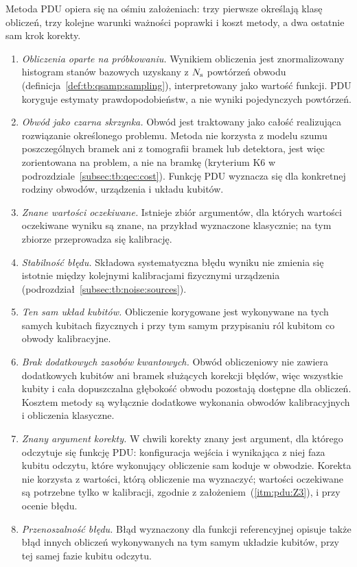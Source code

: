 Metoda PDU opiera się na ośmiu założeniach: trzy pierwsze określają klasę obliczeń, trzy kolejne warunki ważności poprawki i koszt metody, a dwa ostatnie sam krok korekty.
\begin{enumerate}
\renewcommand{\theenumi}{Z\arabic{enumi}}
\renewcommand{\labelenumi}{(\theenumi)}
\item\label{itm:pdu:Z1} \emph{Obliczenia oparte na próbkowaniu.}
Wynikiem obliczenia jest znormalizowany histogram stanów bazowych uzyskany z $N_{\mathrm{s}}$ powtórzeń obwodu (definicja~\ref{def:tb:qsamp:sampling}), interpretowany jako wartość funkcji.
PDU koryguje estymaty prawdopodobieństw, a nie wyniki pojedynczych powtórzeń.
\item\label{itm:pdu:Z2} \emph{Obwód jako czarna skrzynka.}
Obwód jest traktowany jako całość realizująca rozwiązanie określonego problemu.
Metoda nie korzysta z modelu szumu poszczególnych bramek ani z tomografii bramek lub detektora, jest więc zorientowana na problem, a nie na bramkę (kryterium K6 w podrozdziale~\ref{subsec:tb:qec:cost}).
Funkcję PDU wyznacza się dla konkretnej rodziny obwodów, urządzenia i układu kubitów.
\item\label{itm:pdu:Z3} \emph{Znane wartości oczekiwane.}
Istnieje zbiór argumentów, dla których wartości oczekiwane wyniku są znane, na przykład wyznaczone klasycznie; na tym zbiorze przeprowadza się kalibrację.
\item\label{itm:pdu:Z4} \emph{Stabilność błędu.}
Składowa systematyczna błędu wyniku nie zmienia się istotnie między kolejnymi kalibracjami fizycznymi urządzenia (podrozdział~\ref{subsec:tb:noise:sources}).
\item\label{itm:pdu:Z5} \emph{Ten sam układ kubitów.}
Obliczenie korygowane jest wykonywane na tych samych kubitach fizycznych i przy tym samym przypisaniu ról kubitom co obwody kalibracyjne.
\item\label{itm:pdu:Z6} \emph{Brak dodatkowych zasobów kwantowych.}
Obwód obliczeniowy nie zawiera dodatkowych kubitów ani bramek służących korekcji błędów, więc wszystkie kubity i cała dopuszczalna głębokość obwodu pozostają dostępne dla obliczeń.
Kosztem metody są wyłącznie dodatkowe wykonania obwodów kalibracyjnych i obliczenia klasyczne.
\item\label{itm:pdu:Z7} \emph{Znany argument korekty.}
W chwili korekty znany jest argument, dla którego odczytuje się funkcję PDU: konfiguracja wejścia i wynikająca z niej faza kubitu odczytu, które wykonujący obliczenie sam koduje w obwodzie.
Korekta nie korzysta z wartości, którą obliczenie ma wyznaczyć; wartości oczekiwane są potrzebne tylko w kalibracji, zgodnie z założeniem~(\ref{itm:pdu:Z3}), i przy ocenie błędu.
\item\label{itm:pdu:Z8} \emph{Przenoszalność błędu.}
Błąd wyznaczony dla funkcji referencyjnej opisuje także błąd innych obliczeń wykonywanych na tym samym układzie kubitów, przy tej samej fazie kubitu odczytu.
\end{enumerate}

